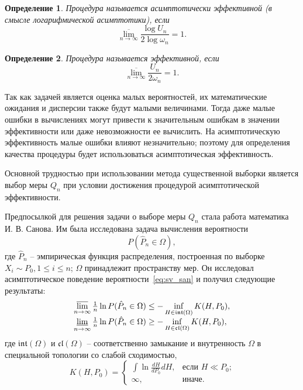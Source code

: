 \documentclass[12pt, specialist, subf, substylefile = spbu.rtx]{disser}
\newtheorem{definition}{Определение}
\DeclareMathOperator*{\toplim}{\overline\lim}
\DeclareMathOperator*{\botlim}{\underline\lim}
\begin{document}
\begin{definition}
Процедура называется асимптотически эффективной (в смысле логарифмической асимптотики), если 
$$
\overline{\lim\limits_{n \to \infty}} \frac{\log U_n}{2 \log \omega_n} = 1.
$$
\end{definition}

\begin{definition}
Процедура называется эффективной, если 
$$
\overline{\lim\limits_{n \to \infty}} \frac{U_n}{2 \omega_n} = 1.
$$
\end{definition}

Так как задачей является оценка малых вероятностей, их математические ожидания и дисперсии также будут малыми величинами. Тогда даже малые ошибки в вычислениях могут привести к значительным ошибкам в значении эффективности или даже невозможности ее вычислить. На асимптотическую эффективность малые ошибки влияют незначительно; поэтому для определения качества процедуры будет использоваться асимптотическая эффективность.

Основной трудностью при использовании метода существенной выборки является выбор меры $Q_n$ при условии достижения процедурой асимптотической эффективности.

Предпосылкой для решения задачи о выборе меры $Q_n$ стала работа математика И. В. Санова. Им была исследована задача вычисления вероятности 
\begin{equation}\label{eq:sv_san}
P(\hat{P}_n \in \Omega),
\end{equation}
где $\hat{P}_n$ -- эмпирическая функция распределения, построенная по выборке $X_i \sim P_0, 1 \le i \le n$; $\Omega$ принадлежит пространству мер. Он исследовал асимптотическое поведение вероятности~\eqref{eq:sv_san} и получил следующие результаты:
\begin{equation}\label{eq:sv_san2}
\begin{tabular}{l}
$\toplim\limits_{n \to \infty} \frac{1}{n} \ln P(\hat{P}_n \in \Omega) \le -\inf\limits_{H\in \mathfrak{int}(\Omega)} K(H, P_0),$
\\
$\botlim\limits_{n \to \infty} \frac{1}{n} \ln P(\hat{P}_n \in \Omega) \ge -\inf\limits_{H\in \mathfrak{cl}(\Omega)} K(H, P_0),$
\end{tabular}
\end{equation}
где $\mathfrak{int}(\Omega)$ и $\mathfrak{cl}(\Omega)$ -- соответственно замыкание и внутренность $\Omega$ в специальной топологии со слабой сходимостью, 
\begin{equation}\label{eq:sv_k}
K(H, P_0)=
\begin{cases}
\int \ln \frac{dH}{dP_0}dH, 
	&\text{если $H \ll P_0$;}\\
\infty,	
	&\text{иначе.}
\end{cases}
\end{equation}
\end{document}
